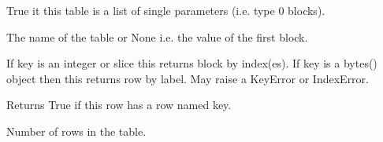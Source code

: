 \documentclass[letterpaper,10pt,english]{sphinxmanual}
\begin{document}
\begin{fulllineitems}
\begin{fulllineitems}
\end{fulllineitems}


\begin{fulllineitems}
\label{\detokenize{ref/LIS/core/LogiRec:TotalDepth.LIS.core.LogiRec.LrTable.isSingleParam}}
True it this table is a list of single parameters (i.e. type 0 blocks).

\end{fulllineitems}


\begin{fulllineitems}
\label{\detokenize{ref/LIS/core/LogiRec:TotalDepth.LIS.core.LogiRec.LrTable.value}}
The name of the table or None i.e. the value of the first block.

\end{fulllineitems}


\begin{fulllineitems}
\label{\detokenize{ref/LIS/core/LogiRec:TotalDepth.LIS.core.LogiRec.LrTable.__getitem__}}
If key is an integer or slice this returns block by index(es).
If key is a bytes() object then this returns row by label.
May raise a KeyError or IndexError.

\end{fulllineitems}


\begin{fulllineitems}
\label{\detokenize{ref/LIS/core/LogiRec:TotalDepth.LIS.core.LogiRec.LrTable.__contains__}}
Returns True if this row has a row named key.

\end{fulllineitems}


\begin{fulllineitems}
\label{\detokenize{ref/LIS/core/LogiRec:TotalDepth.LIS.core.LogiRec.LrTable.__len__}}
Number of rows in the table.


\end{fulllineitems}
\end{fulllineitems}
\end{document}
